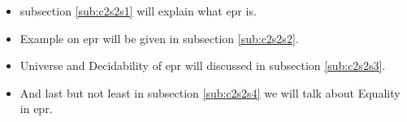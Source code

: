 	\begin{itemize}
		\item subsection \ref{sub:c2s2s1} will explain what \ac{epr} is.
		\item Example on \ac{epr} will be given in subsection \ref{sub:c2s2s2}.
		\item Universe and Decidability of \ac{epr} will discussed in subsection \ref{sub:c2s2s3}.
		\item And last but not least in subsection \ref{sub:c2s2s4} we will talk about Equality in \ac{epr}. 
	\end{itemize}


	




\begin{comment}
	

	

	

	
\end{comment}


   